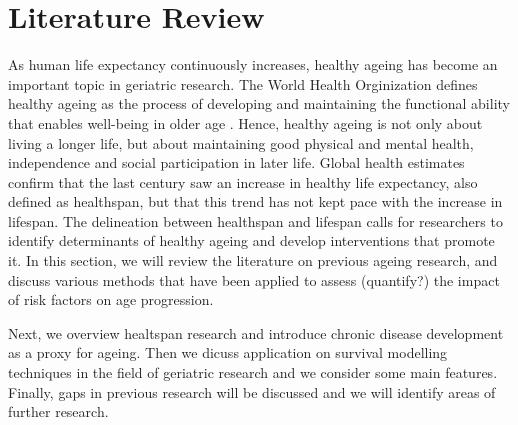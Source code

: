 \chapter{Literature Review}
\label{chap:lit_review} 

As human life expectancy continuously increases, healthy ageing has become an important topic in geriatric research. The World Health Orginization defines healthy ageing as the process of developing and maintaining the functional ability that enables well-being in older age \citep{WHO}. Hence, healthy ageing is not only about living a longer life, but about maintaining good physical and mental health, independence and social participation in later life. Global health estimates confirm that the last century saw an increase in healthy life expectancy, also defined as healthspan, but that this trend has not kept pace with the increase in lifespan. The delineation between healthspan and lifespan calls for researchers to identify determinants of healthy ageing and develop interventions that promote it. In this section, we will review the literature on previous ageing research, and discuss various methods that have been applied to assess (quantify?) the impact of risk factors on age progression. 

Next, we overview healtspan research and introduce chronic disease development as a proxy for ageing. Then we dicuss application on survival modelling techniques in the field of geriatric research and we consider some main features. Finally, gaps in previous research will be discussed and we will identify areas of further research. %



